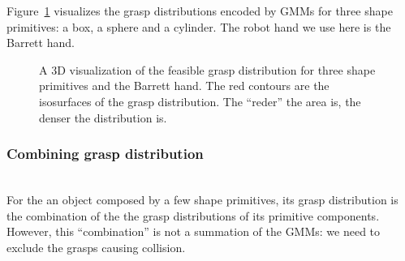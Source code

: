 Figure~\ref{fig:primtivedistr} visualizes the grasp distributions encoded by GMMs for three shape primitives: a box, a sphere and a cylinder. The robot hand we use here is the Barrett hand.

\begin{figure}
  \centering
  \caption{A 3D visualization of the feasible grasp distribution for three shape primitives and the Barrett hand. The red contours are the isosurfaces of the grasp distribution. The ``reder'' the area is, the denser the distribution is.}
  \label{fig:primtivedistr}
\end{figure}


\subsubsection{Combining grasp distribution} ~\\
\label{cha3:sec4:combine:combining}
For the an object composed by a few shape primitives, its grasp distribution is the combination of the the grasp distributions of its primitive components. However, this ``combination'' is not a summation of the GMMs: we need to exclude the grasps causing collision.

